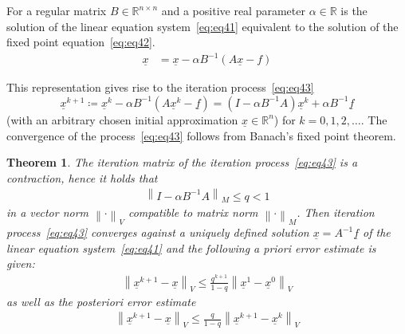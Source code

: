\documentclass{article}
\newtheorem{theorem}{Theorem}
\newcommand{\norm}[1]{\left\|#1\right\|}
\begin{document}
For a regular matrix $B \in \mathbb R^{n\times n}$ and a positive real parameter $\alpha \in \mathbb R$ is the solution of the linear equation system~\ref{eq:eq41} equivalent to the solution of the fixed point equation~\ref{eq:eq42}.
\begin{align}
  \underline{x} &= \underline{x} - \alpha B^{-1} (A\underline{x} - f) \label{eq:eq42}%
\end{align}

This representation gives rise to the iteration process~\ref{eq:eq43}
\[ \underline{x}^{k+1} \coloneqq \underline{x}^k - \alpha B^{-1} (A \underline{x}^k - \underline{f}) = (I - \alpha B^{-1} A) \underline{x}^k + \alpha B^{-1} \underline{f} \label{eq:eq43} \]
(with an arbitrary chosen initial approximation $\underline{x} \in \mathbb R^n$) for $k = 0, 1, 2, \ldots$.
The convergence of the process~\ref{eq:eq43} follows from Banach's fixed point theorem.

\begin{theorem}
  The iteration matrix of the iteration process~\ref{eq:eq43} is a contraction, hence it holds that
  \begin{align} \norm{I - \alpha B^{-1} A}_M \leq q < 1 \label{eq:eq44} \end{align}
  in a vector norm $\norm{\cdot}_V$ compatible to matrix norm $\norm{\cdot}_M$.
  Then iteration process~\ref{eq:eq43} converges against a uniquely defined solution $\underline{x} = A^{-1} \underline{f}$ of the linear equation system~\ref{eq:eq41} and the following a priori error estimate is given:
  \begin{align} \norm{\underline{x}^{k+1} - \underline{x}}_V \leq \frac{q^{k+1}}{1 - q} \norm{\underline{x}^1 - \underline{x}^0}_V \label{eq:eq45} \end{align}
  as well as the posteriori error estimate
  \begin{align} \norm{\underline{x}^{k+1} - \underline{x}}_V \leq \frac{q}{1 - q} \norm{\underline{x}^{k+1} - \underline{x}^k}_V \label{eq:eq46} \end{align}
\end{theorem}
\end{document}
